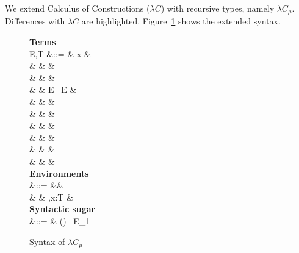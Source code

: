 We extend Calculus of Constructions ($\lambda C$) with recursive
types, namely $\lambda C_{\mu}$. Differences with $\lambda C$ are
highlighted. Figure~\ref{fig:musyn} shows the extended syntax.

\begin{figure}[H]
  \small
  \begin{syntax}
    \textbf{Terms} \\
    E,T &::= & x &  \\
    & \mid & \star &  \\
    & \mid & \square &  \\
    & \mid & E \ E &  \\
    & \mid &  &  \\
    & \mid &  &  \\
    & \mid &  &  \\
    & \mid &  &  \\
    & \mid &  &  \\
    & \mid &  &  \\
    \textbf{Environments} \\
    \Gamma &::= &\varnothing &  \\
    & \mid & \Gamma,x:T &  \\
    \textbf{Syntactic sugar} \\
     &::= & () \ E_{1}
  \end{syntax}
  \caption{Syntax of $\lambda C_\mu$}\label{fig:musyn}
\end{figure}

